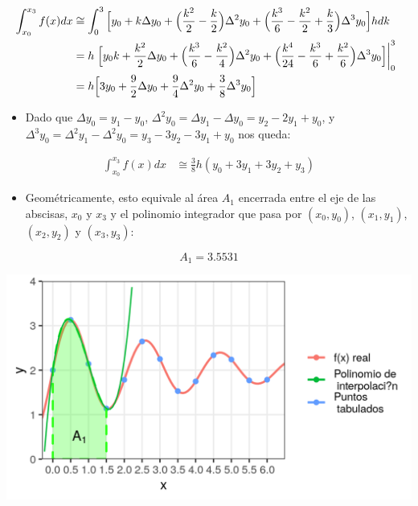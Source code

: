 \documentclass[openany]{book}
\providecommand{\tightlist}{%
  \setlength{\itemsep}{0pt}\setlength{\parskip}{0pt}}
\begin{document}
\[
\hspace{-.25cm}
\begin{aligned}
\int_{x_0}^{x_3} f(x)dx &\cong  \int_{0}^{3} \Big[ y_0 + k \Delta y_0 + \Big( \frac{k^2}{2} - \frac{k}{2} \Big) \Delta^2 y_0  + \Big( \frac{k^3}{6} - \frac{k^2}{2} + \frac{k}{3} \Big) \Delta^3 y_0
\Big]  hdk \\
&= h \left. \Big[ y_0 k + \frac{k^2}{2} \Delta y_0  + \Big( \frac{k^3}{6} - \frac{k^2}{4} \Big) \Delta^2 y_0 + \Big( \frac{k^4}{24} - \frac{k^3}{6} + \frac{k^2}{6} \Big) \Delta^3 y_0 \Big] \right\vert_{0}^{3} \\
&= h \Big[ 3y_0 + \frac{9}{2} \Delta y_0  + \frac{9}{4} \Delta^2 y_0 + \frac{3}{8} \Delta^3 y_0\Big]
\end{aligned}
\]

\begin{itemize}
\tightlist
\item
  Dado que \(\Delta y_0 = y_1 - y_0\), \(\Delta^2 y_0 = \Delta y_1 - \Delta y_0 = y_2 - 2y_1 + y_0\), y \(\Delta^3 y_0 = \Delta^2 y_1 - \Delta^2 y_0 = y_3 - 3y_2 - 3y_1 + y_0\) nos queda:
\end{itemize}

\[
\begin{aligned}
\int_{x_0}^{x_3} f(x)dx &\cong \frac{3}{8} h (y_0 + 3y_1 + 3y_2+y_3)
\end{aligned}
\]

\begin{itemize}
\tightlist
\item
  Geométricamente, esto equivale al área \(A_1\) encerrada entre el eje de las abscisas, \(x_0\) y \(x_3\) y el polinomio integrador que pasa por \((x_0, y_0)\), \((x_1, y_1)\), \((x_2, y_2)\) y \((x_3, y_3)\):
\end{itemize}

\[A_1 = 3.5531\]

\begin{center}\includegraphics[width=1\linewidth]{Plots/U4/Unidad4_2_g8} \end{center}
\end{document}
